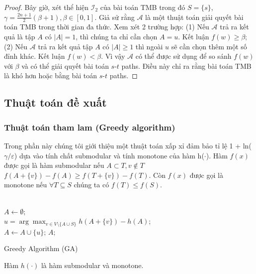 \begin{proof}
	Bây giờ, xét thể hiện $\mathcal{I}_2$ của bài toán TMB trong đó $S=\{s\}$, $\gamma = \frac{2n+1}{2}(\beta+ 1) , \beta \in [0, 1]$.  Giả sử rằng $\mathcal{A}$ là một thuật toán giải quyết bài toán TMB trong thời gian đa thức. Xem xét 2 trường hợp: (1) Nếu $\mathcal{A}$ trả ra kết quả là tập $A$ có $|A|=1$, thì chúng ta chỉ cần chọn $A={u}$. Kết luận $f(w) \geq \beta$; (2) Nếu $\mathcal{A}$ trả ra kết quả tập $A$ có $|A| \ge 1$ thì ngoài $u$ sẽ cần chọn thêm một số đỉnh khác. Kết luận $f(w) < \beta$. Vì vậy $\mathcal{A}$ có thể được sử dụng để so sánh $f(w)$ với $\beta$ và có thể giải quyết bài toán $s$-$t$ paths. Điều này chỉ ra rằng bài toán TMB là khó hơn hoặc bằng bài toán $s$-$t$ paths.
\end{proof}
\subsection{Thuật toán đề xuất}
\subsubsection{Thuật toán tham lam (Greedy algorithm)}
Trong phần này chúng tôi giới thiệu một thuật toán xấp xỉ đảm bảo tỉ lệ 1 + ln($\gamma / \varepsilon$) dựa vào tính chất submodular và tính monotone của hàm h($\cdot$). Hàm $f(x)$ được gọi là hàm submodular nếu $A \subset T, v \notin T$ $ f(A+ \{v\})- f(A) \geq f(T+ \{v\})- f(T)$. Còn $f(x)$ được gọi là monotone nếu $\forall T \subseteq S$ chúng ta có $f(T) \leq f(S)$.
\\
\\
\begin{algorithm}[H]			
	$A \leftarrow \emptyset$;
	\\
	{ 	
		$u=\arg \max_{v \in V\setminus \{A \cup S\}} {h(A+ \{v\})- h(A)}$; 
		\\
		$A \leftarrow A \cup \{u\}$;
	}
	\Return $A$;
	\caption{Greedy Algorithm (GA)}
	\label{GA}
\end{algorithm}
\begin{theo}					
	Hàm $h(\cdot)$ là hàm submodular và monotone. 
	\label{sub}
\end{theo}	

